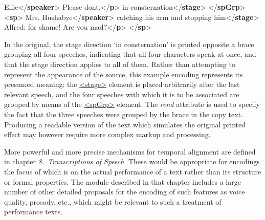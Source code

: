 \begin{shaded}
\mbox{}\newline 
{}\mbox{}\newline 
\hspace*{1em}Ellie{</\textbf{speaker}>}\mbox{}\newline 
\hspace*{1em}Please dont.{</\textbf{p}>}\mbox{}\newline 
{}\mbox{}\newline 
{}in consternation{</\textbf{stage}>}\mbox{}\newline 
{</\textbf{spGrp}>}\mbox{}\newline 
{<\textbf{sp}>}\mbox{}\newline 
{}Mrs. Hushabye{</\textbf{speaker}>}\mbox{}\newline 
{}catching his arm and stopping him{</\textbf{stage}>}\mbox{}\newline 
{}Alfred: for shame! Are you mad?{</\textbf{p}>}\mbox{}\newline 
{</\textbf{sp}>}\end{shaded}\egroup\par \par
In the original, the stage direction ‘in consternation’ is printed opposite a brace grouping all four speeches, indicating that all four characters speak at once, and that the stage direction applies to all of them. Rather than attempting to represent the appearance of the source, this example encoding represents its presumed meaning: the \hyperref[TEI.stage]{<stage>} element is placed arbitrarily after the last relevant speech, and the four speeches with which it is to be associated are grouped by means of the \hyperref[TEI.spGrp]{<spGrp>} element. The {\itshape rend} attribute is used to specify the fact that the three speeches were grouped by the brace in the copy text. Producing a readable version of the text which simulates the original printed effect may however require more complex markup and processing.\par
More powerful and more precise mechanisms for temporal alignment are defined in chapter \textit{\hyperref[TS]{8.\ Transcriptions of Speech}}. These would be appropriate for encodings the focus of which is on the actual performance of a text rather than its structure or formal properties. The module described in that chapter includes a large number of other detailed proposals for the encoding of such features as voice quality, prosody, etc., which might be relevant to such a treatment of performance texts.
